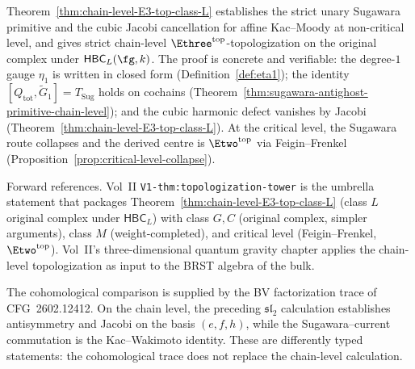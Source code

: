 Theorem~\ref{thm:chain-level-E3-top-class-L} establishes the strict
unary Sugawara primitive and the cubic Jacobi cancellation for
affine Kac--Moody at non-critical level, and gives strict
chain-level $\Ethree^{\mathrm{top}}$-topologization on the original
complex under $\mathsf{HBC}_L(\fg,k)$. The proof is concrete and
verifiable: the degree-$1$ gauge $\eta_1$ is written in closed
form (Definition~\ref{def:eta1}); the identity
$[Q_{\mathrm{tot}}, \widetilde G_1] = T_{\mathrm{Sug}}$ holds on
cochains (Theorem~\ref{thm:sugawara-antighost-primitive-chain-level});
and the cubic harmonic defect vanishes by Jacobi
(Theorem~\ref{thm:chain-level-E3-top-class-L}). At the critical
level, the Sugawara route collapses and the derived centre is
$\Etwo^{\mathrm{top}}$ via Feigin--Frenkel
(Proposition~\ref{prop:critical-level-collapse}).

Forward references. Vol~II \texttt{V1-thm:topologization-tower} is
the umbrella statement that packages
Theorem~\ref{thm:chain-level-E3-top-class-L} (class $L$ original
complex under $\mathsf{HBC}_L$) with class $G, C$ (original
complex, simpler arguments),
class $M$ (weight-completed), and critical level
(Feigin--Frenkel, $\Etwo^{\mathrm{top}}$). Vol~II's
three-dimensional quantum gravity chapter applies the chain-level
topologization as input to the BRST algebra of the bulk.

The cohomological comparison is supplied by the BV factorization trace
of CFG~2602.12412.  On the chain level, the preceding $\mathfrak{sl}_2$
calculation establishes antisymmetry and Jacobi on the basis
$(e,f,h)$, while the Sugawara--current commutation is the
Kac--Wakimoto identity.  These are differently typed statements: the
cohomological trace does not replace the chain-level calculation.

